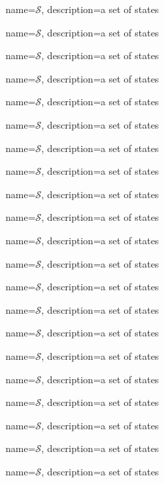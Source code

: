 { 
	name={$\mathcal{S}$},
	description={a set of states}
}

{ 
	name={$\mathcal{S}$},
	description={a set of states}
}

{ 
	name={$\mathcal{S}$},
	description={a set of states}
}

{ 
	name={$\mathcal{S}$},
	description={a set of states}
}

{ 
	name={$\mathcal{S}$},
	description={a set of states}
}

{ 
	name={$\mathcal{S}$},
	description={a set of states}
}

{ 
	name={$\mathcal{S}$},
	description={a set of states}
}

{ 
	name={$\mathcal{S}$},
	description={a set of states}
}

{ 
	name={$\mathcal{S}$},
	description={a set of states}
}

{ 
	name={$\mathcal{S}$},
	description={a set of states}
}

{ 
	name={$\mathcal{S}$},
	description={a set of states}
}

{ 
	name={$\mathcal{S}$},
	description={a set of states}
}

{ 
	name={$\mathcal{S}$},
	description={a set of states}
}

{ 
	name={$\mathcal{S}$},
	description={a set of states}
}

{ 
	name={$\mathcal{S}$},
	description={a set of states}
}

{ 
	name={$\mathcal{S}$},
	description={a set of states}
}

{ 
	name={$\mathcal{S}$},
	description={a set of states}
}

{ 
	name={$\mathcal{S}$},
	description={a set of states}
}

{ 
	name={$\mathcal{S}$},
	description={a set of states}
}

{ 
	name={$\mathcal{S}$},
	description={a set of states}
}

{ 
	name={$\mathcal{S}$},
	description={a set of states}
}

